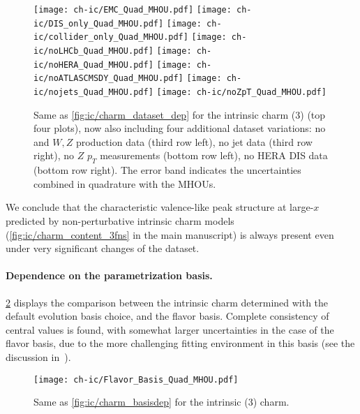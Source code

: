 \begin{figure}[h]
  \begin{center}
    \texttt{[image: ch-ic/EMC\_Quad\_MHOU.pdf]}
    \texttt{[image: ch-ic/DIS\_only\_Quad\_MHOU.pdf]}
    \texttt{[image: ch-ic/collider\_only\_Quad\_MHOU.pdf]}
    \texttt{[image: ch-ic/noLHCb\_Quad\_MHOU.pdf]}
    \texttt{[image: ch-ic/noHERA\_Quad\_MHOU.pdf]}
    \texttt{[image: ch-ic/noATLASCMSDY\_Quad\_MHOU.pdf]}
    \texttt{[image: ch-ic/nojets\_Quad\_MHOU.pdf]}
    \texttt{[image: ch-ic/noZpT\_Quad\_MHOU.pdf]}
    \caption{\small Same as \cref{fig:ic/charm_dataset_dep}
      for the intrinsic charm (3\fns) \pdf (top four plots), now also including
      four additional dataset variations:  no \atlas and \cms $W, Z$
      production data   (third row left),
      no jet data (third row right), no $Z$ $p_T$
      measurements (bottom row left), no HERA
      DIS data (bottom row right).
The error band indicates the \pdf uncertainties combined in quadrature with the MHOUs.
\label{fig:ic/charm_dataset_dep_nf3} }
\end{center}
\end{figure}

We conclude that
the characteristic valence-like peak structure at large-$x$
predicted by non-perturbative intrinsic charm models (\cref{fig:ic/charm_content_3fns}
in the main manuscript)
is always present even under very significant changes of the dataset.
%

\paragraph{Dependence on the parametrization basis.}
%
\cref{fig:ic/charm_basisdep_3FNS} displays
the comparison between the intrinsic charm
\pdf determined with the default evolution basis choice, and the flavor
basis. Complete consistency of central values is found, with somewhat
larger uncertainties in the case of the flavor basis, due to the more 
challenging fitting environment in this basis (see the discussion in~\cite{Ball:2021leu}).

\begin{figure}[t!]
  \begin{center}
    \texttt{[image: ch-ic/Flavor\_Basis\_Quad\_MHOU.pdf]}
    \caption{\small Same as \cref{fig:ic/charm_basisdep}
    for the intrinsic (3\fns) charm.
  \label{fig:ic/charm_basisdep_3FNS} }
\end{center}
\end{figure}


